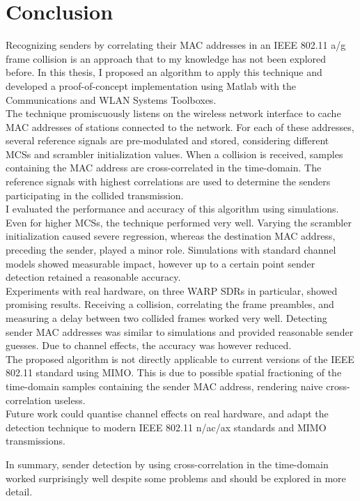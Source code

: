 
\chapter{Conclusion}\label{ch:Conclusion}
\glsresetall %

Recognizing senders by correlating their MAC addresses in an IEEE 802.11 a/g frame collision is an approach that to my knowledge has not been explored before. In this thesis, I proposed an algorithm to apply this technique and developed a proof-of-concept implementation using Matlab with the Communications and WLAN Systems Toolboxes.\\

The technique promiscuously listens on the wireless network interface to cache MAC addresses of stations connected to the network. For each of these addresses, several reference signals are pre-modulated and stored, considering different \glspl{MCS} and scrambler initialization values. When a collision is received, samples containing the MAC address are cross-correlated in the time-domain. The reference signals with highest correlations are used to determine the senders participating in the collided transmission.\\

I evaluated the performance and accuracy of this algorithm using simulations. Even for higher \glspl{MCS}, the technique performed very well. Varying the scrambler initialization caused severe regression, whereas the destination MAC address, preceding the sender, played a minor role. Simulations with standard channel models showed measurable impact, however up to a certain point sender detection retained a reasonable accuracy.\\

Experiments with real hardware, on three \gls{WARP} \glspl{SDR} in particular, showed promising results. Receiving a collision, correlating the frame preambles, and measuring a delay between two collided frames worked very well. Detecting sender MAC addresses was similar to simulations and provided reasonable sender guesses. Due to channel effects, the accuracy was however reduced.\\

The proposed algorithm is not directly applicable to current versions of the IEEE 802.11 standard using \gls{MIMO}. This is due to possible spatial fractioning of the time-domain samples containing the sender MAC address, rendering naive cross-correlation useless.\\

Future work could quantise channel effects on real hardware, and adapt the detection technique to modern IEEE 802.11 n/ac/ax standards and \gls{MIMO} transmissions.

In summary, sender detection by using cross-correlation in the time-domain worked surprisingly well despite some problems and should be explored in more detail.
